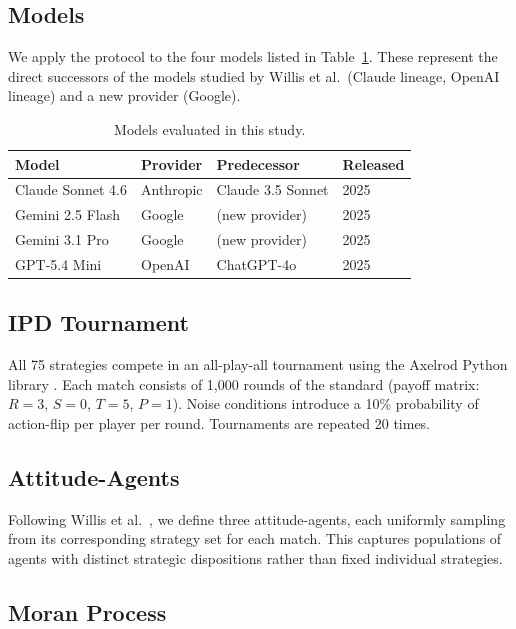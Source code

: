 \subsection{Models}

We apply the protocol to the four models listed in Table~\ref{tab:models}.
These represent the direct successors of the models studied by Willis et al.\
(Claude lineage, OpenAI lineage) and a new provider (Google).

\begin{table}[h]
\caption{Models evaluated in this study.}
\label{tab:models}
\small
\begin{tabular}{@{}llll@{}}
\toprule
\textbf{Model} & \textbf{Provider} & \textbf{Predecessor} & \textbf{Released} \\
\midrule
Claude Sonnet 4.6    & Anthropic & Claude 3.5 Sonnet  & 2025 \\
Gemini 2.5 Flash     & Google    & (new provider)     & 2025 \\
Gemini 3.1 Pro       & Google    & (new provider)     & 2025 \\
GPT-5.4 Mini         & OpenAI    & ChatGPT-4o         & 2025 \\
\bottomrule
\end{tabular}
\end{table}

\subsection{IPD Tournament}

All 75 strategies compete in an all-play-all tournament using the Axelrod Python
library \cite{Knight2016_open}. Each match consists of 1,000 rounds of the
standard \IPD (payoff matrix: $R=3$, $S=0$, $T=5$, $P=1$). Noise conditions
introduce a 10\% probability of action-flip per player per round. Tournaments
are repeated 20 times.

\subsection{Attitude-Agents}

Following Willis et al.\ \cite{Willis2025_llm_ipd}, we define three attitude-agents,
each uniformly sampling from its corresponding strategy set for each match.
This captures populations of agents with distinct strategic dispositions rather
than fixed individual strategies.

\subsection{Moran Process}

